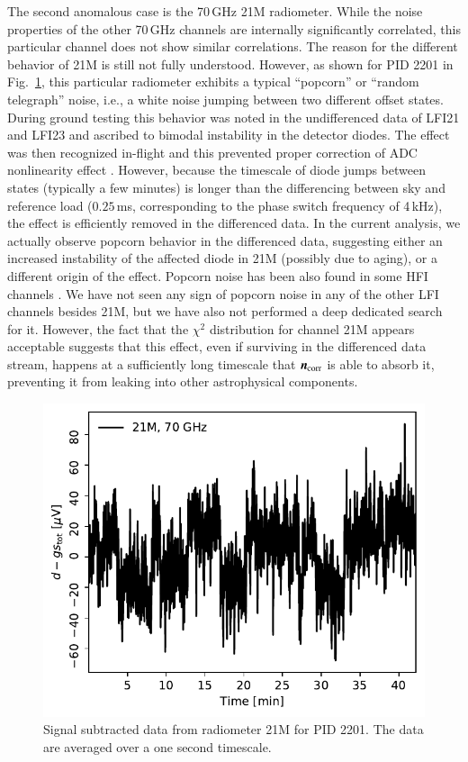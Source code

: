 \documentclass[twocolumn]{aa}
\newcommand{\n}[0]{\vec{n}}
\begin{document}
The second anomalous case is the 70\,GHz 21M radiometer.  While the
noise properties of the other 70\,GHz channels are internally
significantly correlated, this particular channel does not show
similar correlations. The reason for the different behavior of 21M is
still not fully understood. However, as shown for PID 2201 in
Fig.~\ref{fig:popcorn_21M}, this particular radiometer exhibits a
typical “popcorn” or “random telegraph” noise, i.e., a white noise
jumping between two different offset states.  During ground testing
this behavior was noted in the undifferenced data of LFI21 and LFI23
and ascribed to bimodal instability in the detector diodes. The effect
was then recognized in-flight and this prevented proper correction of
ADC nonlinearity effect \citep{planck2013-p02a}. However, because the
timescale of diode jumps between states (typically a few minutes) is
longer than the differencing between sky and reference load
($0.25$\,ms, corresponding to the phase switch frequency of 4\,kHz),
the effect is efficiently removed in the differenced data. In the
current analysis, we actually observe popcorn behavior in the
differenced data, suggesting either an increased instability of the
affected diode in 21M (possibly due to aging), or a different origin
of the effect.  Popcorn noise has been also found in some HFI channels
\citep{planck2011-1.5}. We have not seen any sign of popcorn noise in
any of the other LFI channels besides 21M, but we have also not
performed a deep dedicated search for it. However, the fact that the
$\chi^2$ distribution for channel 21M appears acceptable suggests that
this effect, even if surviving in the differenced data stream, happens
at a sufficiently long timescale that $\n_{\rm corr}$ is able to
absorb it, preventing it from leaking into other astrophysical
components.
\begin{figure}
	\begin{center}
		\includegraphics[width=\linewidth]{figs/popcorn_2201.pdf}
	\end{center}
	\caption{Signal subtracted data from radiometer 21M for PID 2201. The data are averaged over a one second timescale. 
		\label{fig:popcorn_21M}}
\end{figure}
\end{document}
